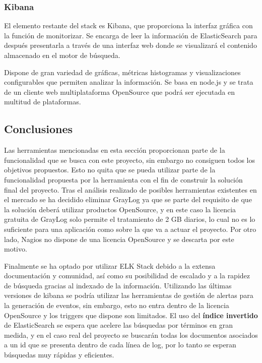 \subsubsection{Kibana}

El elemento restante del stack es Kibana, que proporciona la interfaz gráfica con la función de monitorizar. Se encarga de leer la información de ElasticSearch para después presentarla a través de una interfaz web donde se visualizará el contenido almacenado en el motor de búsqueda.

Dispone de gran variedad de gráficas, métricas histogramas y visualizaciones configurables que permiten analizar la información. Se basa en node.js y se trata de un cliente web multiplataforma OpenSource que podrá ser ejecutada en multitud de plataformas.


\subsection{Conclusiones}

Las herramientas mencionadas en esta sección proporcionan parte de la funcionalidad que se busca con este proyecto, sin embargo no consiguen todos los objetivos propuestos. Esto no quita que se pueda utilizar parte de la funcionalidad propuesta por la herramienta con el fin de construir la solución final del proyecto. Tras el análisis realizado de posibles herramientas existentes en el mercado se ha decidido eliminar GrayLog ya que se parte del requisito de que la solución deberá utilizar productos OpenSource, y en este caso la licencia gratuita de GrayLog solo permite el tratamiento de 2 GB diarios, lo cual no es lo suficiente para una aplicación como sobre la que va a actuar el proyecto. Por otro lado, Nagios no dispone de una licencia OpenSource y se descarta por este motivo.

Finalmente se ha optado por utilizar ELK Stack debido a la extensa documentación y comunidad, así como su posibilidad de escalado y a la rapidez de búsqueda gracias al indexado de la información. Utilizando las últimas versiones de kibana se podría utilizar las herramientas de gestión de alertas para la generación de eventos, sin embargo, esto no entra dentro de la licencia OpenSource y los triggers que dispone son limitados. El uso del \textbf{índice invertido} de ElasticSearch se espera que acelere las búsquedas por términos en gran medida, y en el caso real del proyecto se buscarán todas los documentos asociados a un id que se presenta dentro de cada línea de log, por lo tanto se esperan búsquedas muy rápidas y eficientes.

